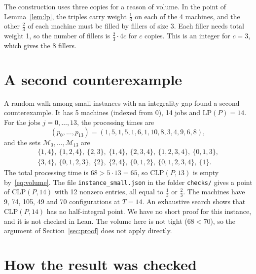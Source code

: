 \documentclass[11pt]{article}
\theoremstyle{remark}
\newcommand{\cM}{\mathcal{M}}
\newcommand{\CLP}{\mathrm{CLP}}
\newcommand{\LP}{\mathrm{LP}}
\begin{document}
The construction uses three copies for a reason of volume. In the point of Lemma~\ref{lem:lp},
the triples carry weight $\frac13$ on each of the 4 machines, and the
other $\frac23$ of each machine must be filled by fillers of size 3.
Each filler needs total weight 1, so the number of fillers is
$\frac23\cdot 4c$ for $c$ copies. This is an integer for $c=3$, which
gives the 8 fillers.

\section{A second counterexample}\label{sec:second}
A random walk among small instances with an integrality gap found a
second counterexample. It has 5 machines (indexed from 0), 14 jobs
and $\LP(P)=14$. For the jobs $j=0,\dots,13$, the processing times are
\[
(p_0,\dots,p_{13})=(1,5,1,5,1,6,1,10,8,3,4,9,6,8),
\]
and the sets $\cM_0,\dots,\cM_{13}$ are
\[
\begin{gathered}
\{1,4\},\ \{1,2,4\},\ \{2,3\},\ \{1,4\},\ \{2,3,4\},\ \{1,2,3,4\},\ \{0,1,3\},\\
\{3,4\},\ \{0,1,2,3\},\ \{2\},\ \{2,4\},\ \{0,1,2\},\ \{0,1,2,3,4\},\ \{1\}.
\end{gathered}
\]
The total processing time is $68>5\cdot 13=65$, so $\CLP(P,13)$ is
empty by~\eqref{eq:volume}. The file \texttt{instance\_small.json} in the folder \texttt{checks/}
gives a point of $\CLP(P,14)$ with 12 nonzero entries, all equal to
$\frac13$ or $\frac23$. The machines have 9, 74, 105, 49 and 70
configurations at $T=14$. An exhaustive search shows that
$\CLP(P,14)$ has no half-integral point. We have no short proof for
this instance, and it is not checked in Lean. The volume here is not
tight ($68<70$), so the argument of Section~\ref{sec:proof} does not
apply directly.

\section{How the result was checked}\label{sec:check}
\end{document}
